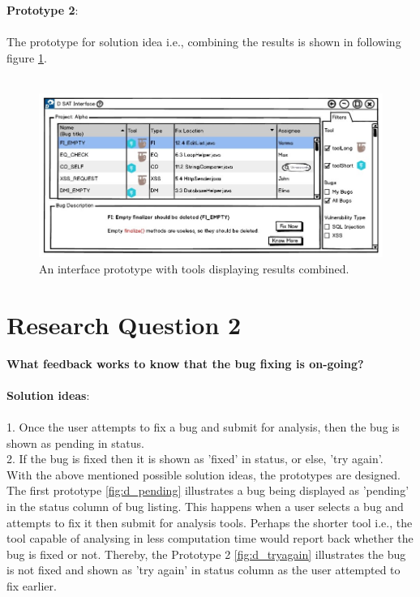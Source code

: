 \textbf{Prototype 2}: \\ \\

The prototype for solution idea i.e., combining the results is shown in following figure \ref{fig:toolCombine}. \\ \\

\begin{figure}[hbt!]
	\centering
	\includegraphics[width=\linewidth]{figures/d_combine}
	\caption{An interface prototype with tools displaying results combined.}
	\label{fig:toolCombine}
\end{figure}

\section{Research Question 2}
\textbf{ What feedback works to know that the bug fixing is on-going?} \\ \\

\textbf{Solution ideas}: \\ \\
1. Once the user attempts to fix a bug and submit for analysis, then the bug is shown as pending in status. \\
2. If the bug is fixed then it is shown as 'fixed' in status, or else, 'try again'. \\

With the above mentioned possible solution ideas, the prototypes are designed. The first prototype \ref{fig:d_pending} illustrates a bug being displayed as 'pending' in the status column of bug listing. This happens when a user selects a bug and attempts to fix it then submit for analysis tools. Perhaps the shorter tool i.e., the tool capable of analysing in less computation time would report back whether the bug is fixed or not. Thereby, the Prototype 2 \ref{fig:d_tryagain} illustrates the bug is not fixed and shown as 'try again' in status column as the user attempted to fix earlier. \\ \\

